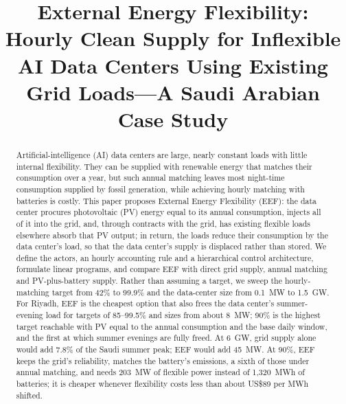 \documentclass[conference]{IEEEtran}
\begin{document}
\title{External Energy Flexibility: Hourly Clean Supply for Inflexible AI Data Centers Using Existing Grid Loads---A Saudi Arabian Case Study}

\author{
}

\maketitle

\begin{abstract}
Artificial-intelligence (AI) data centers are large, nearly constant loads with little internal flexibility. They can be supplied with renewable energy that matches their consumption over a year, but such annual matching leaves most night-time consumption supplied by fossil generation, while achieving hourly matching with batteries is costly. This paper proposes External Energy Flexibility (EEF): the data center procures photovoltaic (PV) energy equal to its annual consumption, injects all of it into the grid, and, through contracts with the grid, has existing flexible loads elsewhere absorb that PV output; in return, the loads reduce their consumption by the data center's load, so that the data center's supply is displaced rather than stored. We define the actors, an hourly accounting rule and a hierarchical control architecture, formulate linear programs, and compare EEF with direct grid supply, annual matching and PV-plus-battery supply. Rather than assuming a target, we sweep the hourly-matching target from 42\% to 99.9\% and the data-center size from 0.1~MW to 1.5~GW. For Riyadh, EEF is the cheapest option that also frees the data center's summer-evening load for targets of 85--99.5\% and sizes from about 8~MW; 90\% is the highest target reachable with PV equal to the annual consumption and the base daily window, and the first at which summer evenings are fully freed. At 6~GW, grid supply alone would add 7.8\% of the Saudi summer peak; EEF would add 45~MW. At 90\%, EEF keeps the grid's reliability, matches the battery's emissions, a sixth of those under annual matching, and needs 203~MW of flexible power instead of 1{,}320~MWh of batteries; it is cheaper whenever flexibility costs less than about US\$89 per MWh shifted.
\end{abstract}
\end{document}
